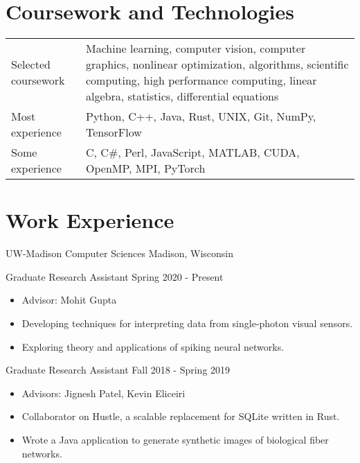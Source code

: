 \section*{Coursework and Technologies}

\begin{tabular}{ @{} p{1.75in} p{5in} }
Selected coursework & Machine learning, computer vision, computer graphics, nonlinear optimization, algorithms, scientific computing, high performance computing, linear algebra, statistics, differential equations \\
Most experience & Python, C++, Java, Rust, UNIX, Git, NumPy, TensorFlow \\
Some experience & C, C\#, Perl, JavaScript, MATLAB, CUDA, OpenMP, MPI, PyTorch
\end{tabular}

\section*{Work Experience}

\begin{tab1} UW-Madison Computer Sciences \> Madison, Wisconsin \end{tab1}

\begin{tab2} Graduate Research Assistant \> Spring 2020 - Present \end{tab2}
\begin{itemize}
    \item Advisor: Mohit Gupta
    \item Developing techniques for interpreting data from single-photon visual sensors.
    \item Exploring theory and applications of spiking neural networks.
\end{itemize}

\begin{tab2} Graduate Research Assistant \> Fall 2018 - Spring 2019 \end{tab2}
\begin{itemize}
    \item Advisors: Jignesh Patel, Kevin Eliceiri
    \item Collaborator on Hustle, a scalable replacement for SQLite written in Rust.
    \item Wrote a Java application to generate synthetic images of biological fiber networks.
\end{itemize}

\blockskip

